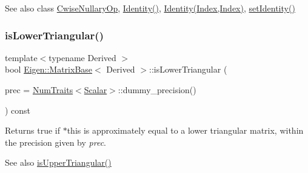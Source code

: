 \begin{DoxySeeAlso}{See also}
class \mbox{\hyperlink{class_eigen_1_1_cwise_nullary_op}{Cwise\+Nullary\+Op}}, \mbox{\hyperlink{class_eigen_1_1_matrix_base_a2ef43190f3aba0aef0cf1030d46d0ca7}{Identity()}}, \mbox{\hyperlink{class_eigen_1_1_matrix_base_ae717f291d83ab229ae64a4903d9f987d}{Identity(\+Index,\+Index)}}, \mbox{\hyperlink{class_eigen_1_1_matrix_base_ae05be7fcc1ade707f0b73eb5f9d8cf33}{set\+Identity()}} 
\end{DoxySeeAlso}
\mbox{\label{class_eigen_1_1_matrix_base_a1e96c42d79a56f0a6ade30ce031e17eb}} 
\subsubsection{\texorpdfstring{isLowerTriangular()}{isLowerTriangular()}}
{\footnotesize\ttfamily template$<$typename Derived $>$ \\
bool \mbox{\hyperlink{class_eigen_1_1_matrix_base}{Eigen\+::\+Matrix\+Base}}$<$ Derived $>$\+::is\+Lower\+Triangular (\begin{DoxyParamCaption}\item[{const Real\+Scalar \&}]{prec = {\ttfamily \mbox{\hyperlink{struct_eigen_1_1_num_traits}{Num\+Traits}}$<$\mbox{\hyperlink{class_eigen_1_1_dense_base_a5feed465b3a8e60c47e73ecce83e39a2}{Scalar}}$>$\+:\+:dummy\+\_\+precision()} }\end{DoxyParamCaption}) const}

\begin{DoxyReturn}{Returns}
true if $\ast$this is approximately equal to a lower triangular matrix, within the precision given by {\itshape prec}.
\end{DoxyReturn}
\begin{DoxySeeAlso}{See also}
\mbox{\hyperlink{class_eigen_1_1_matrix_base_aae3ec1660bb4ac584220481c54ab4a64}{is\+Upper\+Triangular()}} 
\end{DoxySeeAlso}
\mbox{\label{class_eigen_1_1_matrix_base_aefdc8e4e4c156fdd79a21479e75dcd8a}} 
